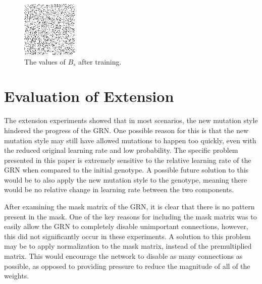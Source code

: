 \documentclass[twocolumn,a4paper,11pt]{article}
\begin{document}
    \begin{figure}[h]
        \centering
        \includegraphics[width=0.45\linewidth]{ex-img/masked_mask.png}
        \caption{The values of $B_s$ after training.} \label{fig:ex-mask}
    \end{figure}

    \section{Evaluation of Extension}
    The extension experiments showed that in most scenarios, the new mutation style hindered the progress of the GRN. One possible reason for this is that the new mutation style may still have allowed mutations to happen too quickly, even with the reduced original learning rate and low probability. The specific problem presented in this paper is extremely sensitive to the relative learning rate of the GRN when compared to the initial genotype. A possible future solution to this would be to also apply the new mutation style to the genotype, meaning there would be no relative change in learning rate between the two components.
    
    After examining the mask matrix of the GRN, it is clear that there is no pattern present in the mask. One of the key reasons for including the mask matrix was to easily allow the GRN to completely disable unimportant connections, however, this did not significantly occur in these experiments. A solution to this problem may be to apply normalization to the mask matrix, instead of the premultiplied matrix. This would encourage the network to disable as many connections as possible, as opposed to providing pressure to reduce the magnitude of all of the weights.
\end{document}
